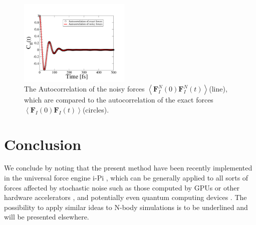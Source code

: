 \documentclass[format=acmsmall,review,timestamp,urlbreakonhyphens]{acmart}
\begin{document}
\begin{figure}%
\begin{center}
\includegraphics[width=0.475\textwidth]
{figures/AutocorrelationPlot_n.pdf}
\end{center}
\caption{\label{Fig4}
The Autocorrelation of the noisy forces \(
\left \langle \textbf{F}_{I}^{N}\left ( 0 \right ) \textbf{F}_{I}^{N}\left ( t \right )\right \rangle \)(line), which are compared to the autocorrelation of the exact forces \( \left \langle \textbf{F}_{I}\left ( 0 \right ) \textbf{F}_{I}\left ( t \right )\right \rangle \)(circles).
} \end{figure}


\section{Conclusion}
\label{sec:conclusion}
We conclude by noting that the present method have been recently implemented in the universal force engine i-Pi \cite{iPi}, which can be generally applied to all sorts of forces affected by stochastic noise such as those computed by GPUs or other hardware accelerators \cite{HOOMD, NAMD, OpenMM, HalMD, Lammps, Amber, Gromacs}, and potentially even quantum computing devices \cite{Steane, Knill, Blatt, Chow}. The possibility to apply similar ideas to N-body simulations \cite{White, Makino} is to be underlined and will be presented elsewhere.
\end{document}
